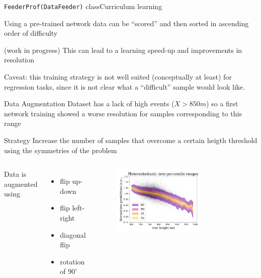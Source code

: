\documentclass{beamer}
\begin{document}
\begin{frame}{\texttt{FeederProf(DataFeeder)} class}{Curriculum learning}
    
    Using a pre-trained network data can be ``scored'' and then sorted in ascending order of difficulty

    (work in progress) This can lead to a learning speed-up and improvements in resolution
    
    Caveat: this training strategy is not well suited (conceptually at least) for regression tasks, 
    since it is not clear what a ``difficult'' sample would look like.
\end{frame}

\begin{frame}{Data Augmentation}
    Dataset has a lack of high events ($X > 850\si{m}$) so a first network training showed a worse resolution
    for samples corresponding to this range

    \begin{block}{Strategy}
        Increase the number of samples that overcome a certain heigth threshold using the
        symmetries of the problem
    \end{block}

    \begin{columns}
        Data is augmented using
    \begin{itemize}
        \item flip up-down
        \item flip left-right
        \item diagonal flip
        \item rotation of $90^{\circ}$
    \end{itemize}
    \begin{figure}
        \centering
        \includegraphics[width=0.7\textwidth]{figures/hetero1.png}
    \end{figure}
    \end{columns}
    
    

\end{frame}
\end{document}

